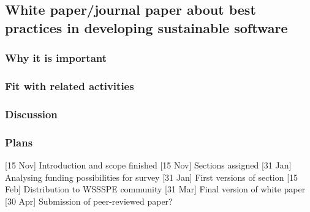 \subsection{White paper/journal paper about best practices in developing sustainable software}

\subsubsection{Why it is important}


\subsubsection{Fit with related activities}

\subsubsection{Discussion}

\subsubsection{Plans}

[15 Nov] Introduction and scope finished
[15 Nov] Sections assigned
[31 Jan] Analysing funding possibilities for survey
[31 Jan] First versions of section
[15 Feb] Distribution to WSSSPE community
[31 Mar] Final version of white paper
[30 Apr] Submission of peer-reviewed paper?


